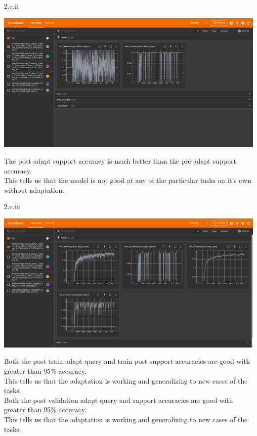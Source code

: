 \LARGE
2.c.ii
\normalsize

\begin{answer}
	\begin{center}
		\includegraphics[width=1.0\textwidth]{pre_post_adapt_support}
	\end{center}
	The post adapt support accuracy is much better than the pre adapt support accuracy. \\
	This tells us that the model is not good at any of the particular tasks on it's own without adaptation.
\end{answer}

\LARGE
2.c.iii
\normalsize

\begin{answer}
	\begin{center}
		\includegraphics[width=1.0\textwidth]{post}
	\end{center}
	Both the post train adapt query and train post support accuracies are good with greater than 95\% accuracy. \\
	This tells us that the adaptation is working and generalizing to new cases of the tasks. \\
	Both the post validation adapt query and support accuracies are good with greater than 95\% accuracy. \\
	This tells us that the adaptation is working and generalizing to new cases of the tasks.
\end{answer}

